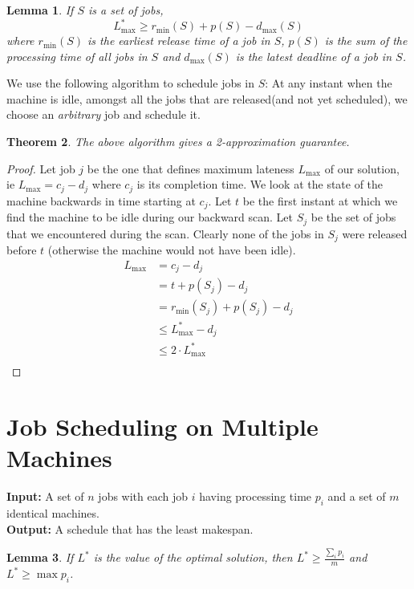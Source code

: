\documentclass[10pt]{article}
\newtheorem{theorem}{Theorem}[section]
\newtheorem{lemma}[theorem]{Lemma}
\begin{document}
\begin{lemma}
If $S$ is a set of jobs,
\[
L_{\max}^* \geq r_{\min}(S) + p(S) - d_{\max}(S) 
\]
where $r_{\min}(S)$ is the earliest release time of a job in $S$, $p(S)$ is the sum of the processing time of all jobs in $S$ and $d_{\max}(S)$ is the latest deadline of a job in $S$.
\end{lemma}
\bigskip

We use the following algorithm to schedule jobs in $S$: At any instant when the machine is idle, amongst all the jobs that are released(and not yet scheduled), we choose an \emph{arbitrary} job and schedule it.

\begin{theorem}
The above algorithm gives a 2-approximation guarantee.
\end{theorem}
\begin{proof}
Let job $j$ be the one that defines maximum lateness $L_{\max}$ of our solution, ie $L_{\max} = c_j - d_j$ where $c_j$ is its completion time. We look at the state of the machine backwards in time starting at $c_j$. Let $t$ be the first instant at which we find the machine to be idle during our backward scan. Let $S_j$ be the set of jobs that we encountered during the scan. Clearly none of the jobs in $S_j$ were released before $t$ (otherwise the machine would not have been idle).
\begin{align*}
L_{\max}    & = c_j - d_j \\
            & = t + p(S_j) - d_j \\
            & = r_{\min}(S_j) + p(S_j) - d_j \\
            & \leq L_{\max}^* - d_j \\
            & \leq 2 \cdot L_{\max}^* \\
\end{align*}
\end{proof}

\section{Job Scheduling on Multiple Machines}
\textbf{Input: } A set of $n$ jobs with each job $i$ having processing time $p_i$ and a set of $m$ identical machines. \\
\textbf{Output: } A schedule that has the least makespan. \\

\begin{lemma}
If $L^*$ is the value of the optimal solution, then $L^* \geq \frac{\sum_{i} p_i}{m}$ and $L^* \geq \max p_i$.
\end{lemma}
\end{document}
